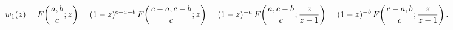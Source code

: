 \[w_{1}(z)=\mathop{F\/}\nolimits\!\left({a,b\atop c};z\right)=(1-z)^{c-a-b}%
\mathop{F\/}\nolimits\!\left({c-a,c-b\atop c};z\right)=(1-z)^{-a}\mathop{F\/}%
\nolimits\!\left({a,c-b\atop c};\frac{z}{z-1}\right)=(1-z)^{-b}\mathop{F\/}%
\nolimits\!\left({c-a,b\atop c};\frac{z}{z-1}\right).\]